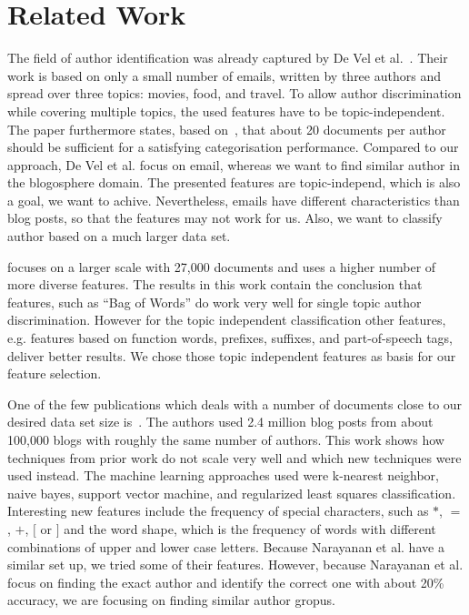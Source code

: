 
\section{Related Work}
\label{sec:related}


The field of author identification was already captured by De Vel et al.~\cite{de2001mining}.
Their work is based on only a small number of emails, written by three authors and spread over three topics: movies, food, and travel.
To allow author discrimination while covering multiple topics, the used features have to be topic-independent.
The paper furthermore states, based on~\cite{corney2001identifying}, that about 20 documents per author should be sufficient for a satisfying categorisation performance.
Compared to our approach, De Vel et al. focus on email, whereas we want to find similar author in the blogosphere domain.
The presented features are topic-independ, which is also a goal, we want to achive.
Nevertheless, emails have different characteristics than blog posts, so that the features may not work for us.
Also, we want to classify author based on a much larger data set.


\cite{madigan2005author} focuses on a larger scale with 27,000 documents and uses a higher number of more diverse features.
The results in this work contain the conclusion that features, such as ``Bag of Words'' do work very well for single topic author discrimination.
However for the topic independent classification other features, e.g. features based on function words, prefixes, suffixes, and part-of-speech tags, deliver better results.
We chose those topic independent features as basis for our feature selection.


One of the few publications which deals with a number of documents close to our desired data set size is~\cite{narayanan2012feasibility}.
The authors used 2.4 million blog posts from about 100,000 blogs with roughly the same number of authors.
This work shows how techniques from prior work do not scale very well and which new techniques were used instead.
The machine learning approaches used were k-nearest neighbor, naive bayes, support vector machine, and regularized least squares classification.
Interesting new features include the frequency of special characters, such as $*$, $=$, $+$, $[$ or $]$ and the word shape, which is the frequency of words with different combinations of upper and lower case letters.
Because Narayanan et al. have a similar set up, we tried some of their features.
However, because Narayanan et al. focus on finding the exact author and identify the correct one with about 20\% accuracy, we are focusing on finding similar author gropus.


